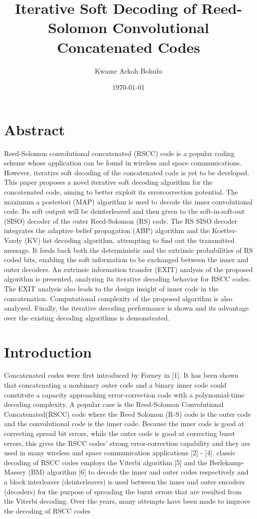 \documentclass[fontsize=12pt]{article}
\title{Iterative Soft Decoding of Reed-Solomon
Convolutional Concatenated Codes}
\author{Kwame Ackah Bohulu}
\date{\today}
\begin{document}
\maketitle

\newpage
\section{Abstract}
Reed-Solomon convolutional concatenated (RSCC)
code is a popular coding scheme whose application can be
found in wireless and space communications. However, iterative
soft decoding of the concatenated code is yet to be developed.
This paper proposes a novel iterative soft decoding algorithm
for the concatenated code, aiming to better exploit its errorcorrection
potential. The maximum a posteriori (MAP) algorithm
is used to decode the inner convolutional code. Its soft output
will be deinterleaved and then given to the soft-in-soft-out
(SISO) decoder of the outer Reed-Solomon (RS) code. The RS
SISO decoder integrates the adaptive belief propagation (ABP)
algorithm and the Koetter-Vardy (KV) list decoding algorithm,
attempting to find out the transmitted message. It feeds back both
the deterministic and the extrinsic probabilities of RS coded bits,
enabling the soft information to be exchanged between the inner
and outer decoders. An extrinsic information transfer (EXIT)
analysis of the proposed algorithm is presented, analyzing its
iterative decoding behavior for RSCC codes. The EXIT analysis
also leads to the design insight of inner code in the concatenation.
Computational complexity of the proposed algorithm is also
analyzed. Finally, the iterative decoding performance is shown
and its advantage over the existing decoding algorithms is
demonstrated.
\section{Introduction}
Concatenated codes were first introduced by Forney
in [1]. It has been shown that concatenating a nonbinary
outer code and a binary inner code could constitute a capacity
approaching error-correction code with a polynomial-time
decoding complexity. A popular case is the Reed-Solomon Convolutional Concatenated(RSCC) code where the Reed Solomon (R-S) code is the outer code and the convolutional code is the inner code. Because the inner code is good
at correcting spread bit errors, while the outer code is good
at correcting burst errors, this gives the RSCC codes’ strong
error-correction capability and they are used in many wireless and space communication applications [2] - [4].
classic decoding of RSCC codes employs
the Viterbi algorithm [5] and the Berlekamp-Massey (BM)
algorithm [6] to decode the inner and outer codes respectively and a block interleaver (deinterleaver) is used between the
inner and outer encoders (decoders) for the purpose of spreading the
burst errors that are resulted from the Viterbi decoding.
Over the years, many attempts have been made to improve the decoding of RSCC codes
\end{document}
